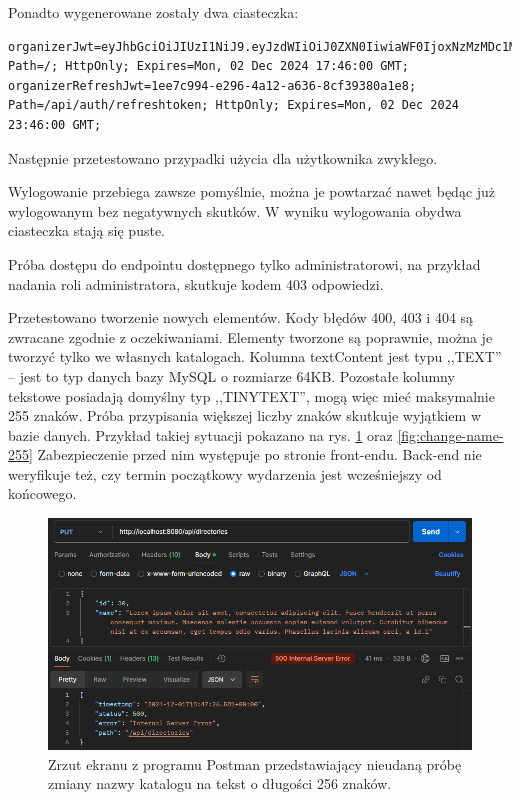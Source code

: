 \documentclass[a4paper,twoside,12pt]{book}
\begin{document}
Ponadto wygenerowane zostały dwa ciasteczka:
\begin{verbatim}
organizerJwt=eyJhbGciOiJIUzI1NiJ9.eyJzdWIiOiJ0ZXN0IiwiaWF0IjoxNzMzMDc1MTYxLCJleHAiOjE3MzMxNjE1NjF9.UOpUtCw0G1TgcEf9ufIk2T00JqQ8ARo61cZJnYslPdU; Path=/; HttpOnly; Expires=Mon, 02 Dec 2024 17:46:00 GMT;
organizerRefreshJwt=1ee7c994-e296-4a12-a636-8cf39380a1e8; Path=/api/auth/refreshtoken; HttpOnly; Expires=Mon, 02 Dec 2024 23:46:00 GMT;
\end{verbatim}

Następnie przetestowano przypadki użycia dla użytkownika zwykłego.

Wylogowanie przebiega zawsze pomyślnie, można je powtarzać nawet będąc już wylogowanym bez negatywnych skutków. W wyniku wylogowania obydwa ciasteczka stają się puste.

Próba dostępu do endpointu dostępnego tylko administratorowi, na przykład nadania roli administratora, skutkuje kodem 403 odpowiedzi.

Przetestowano tworzenie nowych elementów. Kody błędów 400, 403 i 404 są zwracane zgodnie z oczekiwaniami. Elementy tworzone są poprawnie, można je tworzyć tylko we własnych katalogach. Kolumna textContent jest typu ,,TEXT'' -- jest to typ danych bazy MySQL o rozmiarze 64KB. Pozostałe kolumny tekstowe posiadają domyślny typ ,,TINYTEXT'', mogą więc mieć maksymalnie 255 znaków. Próba przypisania większej liczby znaków skutkuje wyjątkiem w bazie danych. Przykład takiej sytuacji pokazano na rys. \ref{fig:change-name-256} oraz \ref{fig:change-name-255} Zabezpieczenie przed nim występuje po stronie front-endu. Back-end nie weryfikuje też, czy termin początkowy wydarzenia jest wcześniejszy od końcowego.

\begin{figure}
\centering
\includegraphics[width=\textwidth]{./ChangeName256.png}
\caption{Zrzut ekranu z programu Postman przedstawiający nieudaną próbę zmiany nazwy katalogu na tekst o długości 256 znaków.}
\label{fig:change-name-256}
\end{figure}
\end{document}
